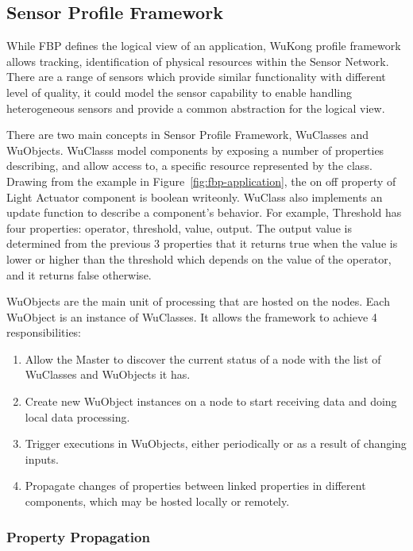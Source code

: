 \subsection{Sensor Profile Framework}

While FBP defines the logical view of an application, WuKong profile framework allows
tracking, identification of physical resources within the Sensor Network.
There are a range of sensors which provide similar functionality with different
level of quality, it could model the sensor capability to enable handling
heterogeneous sensors and provide a common abstraction for the logical view.

There are two main concepts in Sensor Profile Framework, WuClasses and
WuObjects. WuClasss model components by exposing a number of properties
describing, and allow access to, a specific resource represented by the class.
Drawing from the example in Figure~\ref{fig:fbp-application}, the on off property of Light
Actuator component is boolean writeonly. WuClass also implements an update
function to describe a component's behavior. For
example, Threshold has four properties: operator, threshold, value, output. The
output value is determined from the previous 3 properties that it returns true
when the value is lower or higher than the threshold which depends on the value
of the operator, and it returns false otherwise.


WuObjects are the main unit of processing that are hosted on the nodes. Each
WuObject is an instance of WuClasses. It allows the framework to achieve
4 responsibilities:
\begin{enumerate}
\item Allow the Master to discover the current status of a node with the list
of WuClasses and WuObjects it has.
\item Create new WuObject instances on a node to start receiving data and doing
local data processing.
\item Trigger executions in WuObjects, either periodically or as a result of
changing inputs.
\item Propagate changes of properties between linked properties in different
components, which may be hosted locally or remotely.
\end{enumerate}

\subsubsection{Property Propagation}

